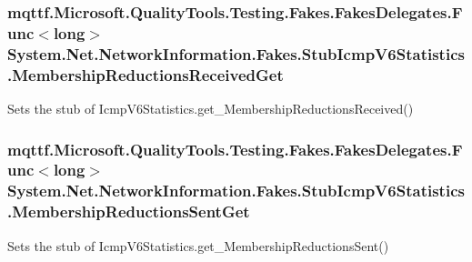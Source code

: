 \hypertarget{class_system_1_1_net_1_1_network_information_1_1_fakes_1_1_stub_icmp_v6_statistics_a5d91c1133310b48883c375ad0e1d288b}{
\subsubsection[{Membership\-Reductions\-Received\-Get}]{\setlength{\rightskip}{0pt plus 5cm}mqttf.\-Microsoft.\-Quality\-Tools.\-Testing.\-Fakes.\-Fakes\-Delegates.\-Func$<$long$>$ System.\-Net.\-Network\-Information.\-Fakes.\-Stub\-Icmp\-V6\-Statistics.\-Membership\-Reductions\-Received\-Get}}\label{class_system_1_1_net_1_1_network_information_1_1_fakes_1_1_stub_icmp_v6_statistics_a5d91c1133310b48883c375ad0e1d288b}


Sets the stub of Icmp\-V6\-Statistics.\-get\-\_\-\-Membership\-Reductions\-Received()

\hypertarget{class_system_1_1_net_1_1_network_information_1_1_fakes_1_1_stub_icmp_v6_statistics_a22dec6dad4ddf7aff50461618c77a719}{
\subsubsection[{Membership\-Reductions\-Sent\-Get}]{\setlength{\rightskip}{0pt plus 5cm}mqttf.\-Microsoft.\-Quality\-Tools.\-Testing.\-Fakes.\-Fakes\-Delegates.\-Func$<$long$>$ System.\-Net.\-Network\-Information.\-Fakes.\-Stub\-Icmp\-V6\-Statistics.\-Membership\-Reductions\-Sent\-Get}}\label{class_system_1_1_net_1_1_network_information_1_1_fakes_1_1_stub_icmp_v6_statistics_a22dec6dad4ddf7aff50461618c77a719}


Sets the stub of Icmp\-V6\-Statistics.\-get\-\_\-\-Membership\-Reductions\-Sent()

